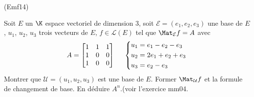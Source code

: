 \begin{tiny}(Emf14)\end{tiny}
Soit $E$ un $\K$ espace vectoriel de dimension $3$, soit $\mathcal E=(e_1,e_2,e_3)$ une base de $E$, $u_1$, $u_2$, $u_3$ trois vecteurs de $E$, $f\in \mathcal L(E)$ tel que $\Mat_{\mathcal E}f=A$ avec
\begin{displaymath}
A=
 \begin{bmatrix}
  1 & 1 & 1 \\
1 & 0 & 0 \\
1 & 0 & 0
 \end{bmatrix}
\hspace{0.5cm}
\left\lbrace 
\begin{aligned}
 u_1 &= e_1 -e_2 -e_3 \\
 u_2 &= 2e_1 +e_2 +e_3 \\
 u_3 &= e_2 - e_3
\end{aligned}
\right. 
\end{displaymath}
Montrer que $\mathcal U =(u_1,u_2,u_3)$ est une base de $E$. Former $\Mat_{\mathcal U}f$ et la formule de changement de base. En déduire $A^n$.(voir l'exercice mm04.
